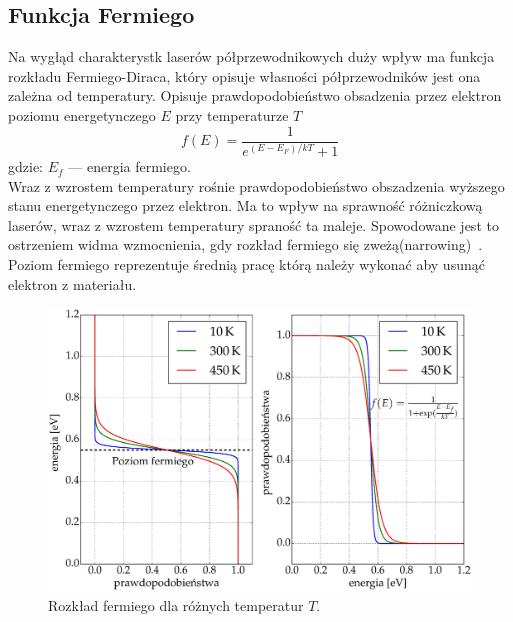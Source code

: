 \subsection{Funkcja Fermiego}
Na wygłąd charakterystk laserów półprzewodnikowych duży wpływ ma funkcja rozkładu Fermiego-Diraca, który opisuje
własności półprzewodników jest ona zależna od temperatury. Opisuje prawdopodobieństwo obsadzenia przez elektron poziomu
energetynczego $E$ przy temperaturze $T$
\begin{equation}
f(E) = \frac{1}{e^{(E-E_F)/kT} + 1}
\end{equation}
gdzie: $E_f$ --- energia fermiego. \\
Wraz z wzrostem temperatury rośnie prawdopodobieństwo obszadzenia wyższego stanu energetynczego przez elektron. Ma to
wpływ na sprawność różniczkową laserów, wraz z wzrostem temperatury spraność ta maleje. Spowodowane jest to ostrzeniem
widma wzmocnienia, gdy rozkład fermiego się zweżą(narrowing)~\cite{publikacja_1}.
Poziom fermiego reprezentuje średnią pracę którą należy wykonać aby usunąć elektron z materiału.
\begin{figure}
\center
  \includegraphics[scale=0.30]{fermi.eps}
  \caption{Rozkład fermiego dla różnych temperatur $T$.}
  \label{teoria_rys_1}
\end{figure}

\newpage